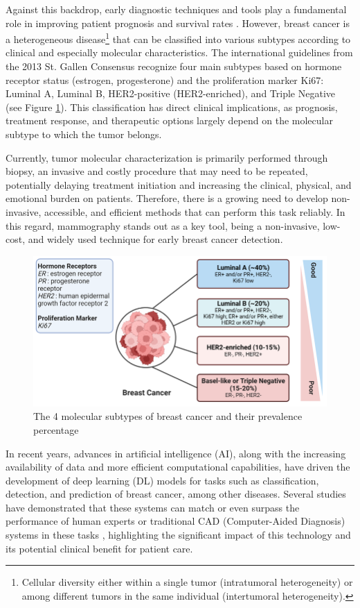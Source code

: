 \documentclass[a4paper,10pt]{book}
\begin{document}
Against this backdrop, early diagnostic techniques and tools play a fundamental role in improving patient prognosis and survival rates \cite{wang_early_2017}. However, breast cancer is a heterogeneous disease\footnote{Cellular diversity either within a single tumor (intratumoral heterogeneity) or among different tumors in the same individual (intertumoral heterogeneity).} that can be classified into various subtypes according to clinical and especially molecular characteristics. The international guidelines from the 2013 St. Gallen Consensus \cite{goldhirsch_personalizing_2013} recognize four main subtypes based on hormone receptor status (estrogen, progesterone) and the proliferation marker Ki67: Luminal A, Luminal B, HER2-positive (HER2-enriched), and Triple Negative (see Figure \ref{fig:subtypes}). This classification has direct clinical implications, as prognosis, treatment response, and therapeutic options largely depend on the molecular subtype to which the tumor belongs.

Currently, tumor molecular characterization is primarily performed through biopsy, an invasive and costly procedure that may need to be repeated, potentially delaying treatment initiation and increasing the clinical, physical, and emotional burden on patients. Therefore, there is a growing need to develop non-invasive, accessible, and efficient methods that can perform this task reliably. In this regard, mammography stands out as a key tool, being a non-invasive, low-cost, and widely used technique for early breast cancer detection.

\begin{figure}
    \centering
    \includegraphics[width=0.8\linewidth]{reports/assets/subtypes.png}
    \caption{The 4 molecular subtypes of breast cancer and their prevalence percentage \cite{harnessing_2024}}
    \label{fig:subtypes}
\end{figure}

In recent years, advances in artificial intelligence (AI), along with the increasing availability of data and more efficient computational capabilities, have driven the development of deep learning (DL) models for tasks such as classification, detection, and prediction of breast cancer, among other diseases. Several studies have demonstrated that these systems can match or even surpass the performance of human experts or traditional CAD (Computer-Aided Diagnosis) systems in these tasks \cite{mckinney_international_2020,pattanaik_breast_2022,meenalochini_deep_2024,hussain_performance_2025}, highlighting the significant impact of this technology and its potential clinical benefit for patient care.
\end{document}

